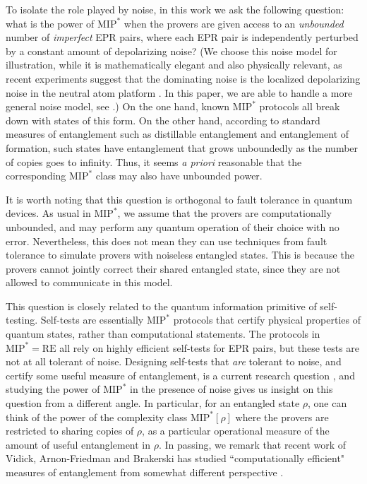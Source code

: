\documentclass[10pt,a4paper]{article}
\theoremstyle{plain}
\theoremstyle{definition}
\newcommand{\1}{\mathbb{1}} %
\newcommand{\MIP}{\mathrm{MIP}}
\newcommand{\RE}{\mathrm{RE}}
\begin{document}
To isolate the role played by noise, in this work we ask the following question: what is the power of $\MIP^*$ when the provers are given access to an \emph{unbounded} number of \emph{imperfect} EPR pairs, where each EPR pair is independently perturbed by a constant amount of depolarizing noise? (We choose this noise model for illustration, while it is mathematically elegant and also physically relevant, as recent experiments suggest that the dominating noise is the localized depolarizing noise in the neutral atom platform \cite{bluvstein2023logical}. In this paper, we are able to handle a more general noise model, see .) On the one hand, known $\MIP^*$ protocols all break down with states of this form. On the other hand, according to standard measures of entanglement such as distillable entanglement and entanglement of formation, such states have entanglement that grows unboundedly as the number of copies goes to infinity. Thus, it seems \emph{a priori} reasonable that the corresponding $\MIP^*$ class may also have unbounded power.

It is worth noting that this question is orthogonal to fault tolerance in quantum devices. As usual in $\MIP^*$, we assume that the provers are computationally unbounded, and may perform any quantum operation of their choice with no error. Nevertheless, this does not mean they can use techniques from fault tolerance to simulate provers with noiseless entangled states. This is because the provers cannot jointly correct their shared entangled state, since they are not allowed to communicate in this model.  


This question is closely related to the quantum information primitive of self-testing. Self-tests are essentially $\MIP^*$ protocols that certify physical properties of quantum states, rather than computational statements. The protocols in $\MIP^* = \RE$ all rely on highly efficient self-tests for EPR pairs, but these tests are not at all tolerant of noise. Designing self-tests that \emph{are} tolerant to noise, and certify some useful measure of entanglement, is a current research question \cite{arnonFYen2018,arnon2019device}, and studying the power of $\MIP^*$ in the presence of noise gives us insight on this question from a different angle. In particular, for an entangled state $\rho$, one can think of the power of the complexity class $\MIP^*[\rho]$ where the provers are restricted to sharing copies of $\rho$, as a particular operational measure of the amount of useful entanglement in $\rho$. In passing, we remark that recent work of Vidick, Arnon-Friedman and Brakerski has studied ``computationally efficient" measures of entanglement from somewhat different perspective \cite{arnon2023computational}.
\end{document}
